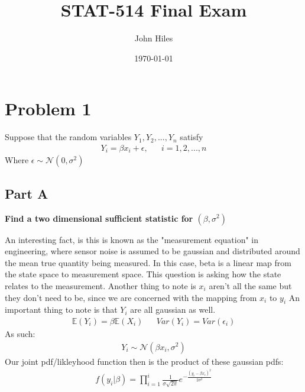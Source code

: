 \documentclass{article}
\title{STAT-514 Final Exam}
\author{John Hiles}
\date\today
\begin{document}
\maketitle %


\section*{Problem 1}
Suppose that the random variables $Y_1, Y_2, . . . , Y_n$ satisfy
\begin{align*}
Y_i = \beta x_i + \epsilon , && i = 1,2,...,n
\end{align*}
Where $\epsilon \sim \mathcal{N}(0,\sigma^2)$
\subsection*{Part A}
\textbf{Find a two dimensional sufficient statistic for $(\beta,\sigma^2)$}

An interesting fact, is this is known as the "measurement equation" in engineering, where sensor noise is assumed to be gaussian and distributed around the mean true quantity being measured. In this case, beta is a linear map from the state space to measurement space. This question is asking how the state relates to the measurement. Another thing to note is $x_i$ aren't all the same but they don't need to be, since we are concerned with the mapping from $x_i$ to $y_i$ An important thing to note is that $Y_i$ are all gaussian as well.
\begin{align*}
\mathbb{E}(Y_i) = \beta\mathbb{E}(X_i) && Var(Y_i) = Var(\epsilon_i)
\end{align*}
As such:
\begin{align*}
Y_i \sim \mathcal{N}(\beta x_i, \sigma^2)
\end{align*}
Our joint pdf/likleyhood function then is the product of these gaussian pdfs:
\begin{align*}
f(y_i|\beta) = \prod_{i=1}^{i} \frac{1}{\sigma \sqrt{2 \pi}} e^{-\frac{(y_i - \beta x_i)^2}{2\sigma^2}}
\end{align*}
\end{document}
